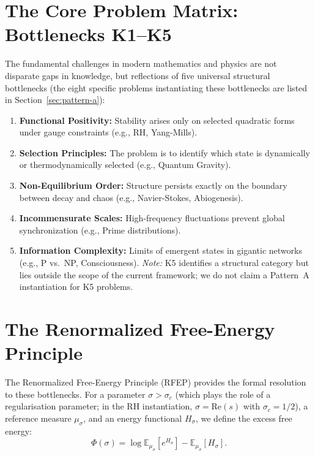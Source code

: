 \documentclass[12pt,a4paper]{article}
\theoremstyle{definition}
\theoremstyle{remark}
\newcommand{\EE}{\mathbb{E}}
\begin{document}
\section{The Core Problem Matrix: Bottlenecks K1--K5}

The fundamental challenges in modern mathematics and physics are not disparate gaps in knowledge, but reflections of five universal structural bottlenecks (the eight specific problems instantiating these bottlenecks are listed in Section~\ref{sec:pattern-a}):
\begin{enumerate}[label=\textbf{K\arabic*:}, leftmargin=3.5em]
    \item \textbf{Functional Positivity:} Stability arises only on selected quadratic forms under gauge constraints (e.g., RH, Yang-Mills).
    \item \textbf{Selection Principles:} The problem is to identify which state is dynamically or thermodynamically selected (e.g., Quantum Gravity).
    \item \textbf{Non-Equilibrium Order:} Structure persists exactly on the boundary between decay and chaos (e.g., Navier-Stokes, Abiogenesis).
    \item \textbf{Incommensurate Scales:} High-frequency fluctuations prevent global synchronization (e.g., Prime distributions).
    \item \textbf{Information Complexity:} Limits of emergent states in gigantic networks (e.g., P vs.\ NP, Consciousness). \emph{Note:} K5 identifies a structural category but lies outside the scope of the current framework; we do not claim a Pattern~A instantiation for K5 problems.
\end{enumerate}

\section{The Renormalized Free-Energy Principle}

The Renormalized Free-Energy Principle (RFEP) provides the formal resolution to these bottlenecks. For a parameter $\sigma > \sigma_c$ (which plays the role of a regularisation parameter; in the RH instantiation, $\sigma = \mathrm{Re}(s)$ with $\sigma_c = 1/2$), a reference measure $\mu_\sigma$, and an energy functional $H_\sigma$, we define the excess free energy:
\begin{equation}\label{eq:rfep}
    \Phi(\sigma) = \log \EE_{\mu_\sigma}[e^{H_\sigma}] - \EE_{\mu_\sigma}[H_\sigma].
\end{equation}
\end{document}
